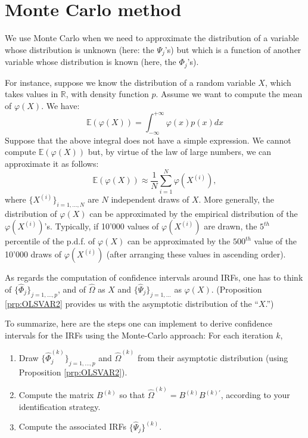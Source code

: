 \documentclass[
  12pt,
]{book}
\providecommand{\tightlist}{%
  \setlength{\itemsep}{0pt}\setlength{\parskip}{0pt}}
\theoremstyle{definition}
\theoremstyle{definition}
\theoremstyle{definition}
\theoremstyle{definition}
\theoremstyle{remark}
\begin{document}
\hypertarget{MonteCarlo}{%
\section{Monte Carlo method}\label{MonteCarlo}}

We use Monte Carlo when we need to approximate the distribution of a variable whose distribution is unknown (here: the \(\Psi_j\)'s) but which is a function of another variable whose distribution is known (here, the \(\Phi_j\)'s).

For instance, suppose we know the distribution of a random variable \(X\), which takes values in \(\mathbb{R}\), with density function \(p\). Assume we want to compute the mean of \(\varphi(X)\). We have:
\[
\mathbb{E}(\varphi(X))=\int_{-\infty}^{+\infty}\varphi(x)p(x)dx
\]
Suppose that the above integral does not have a simple expression. We cannot compute \(\mathbb{E}(\varphi(X))\) but, by virtue of the law of large numbers, we can approximate it as follows:
\[
\mathbb{E}(\varphi(X))\approx\frac{1}{N}\sum_{i=1}^N\varphi(X^{(i)}),
\]
where \(\{X^{(i)}\}_{i=1,...,N}\) are \(N\) independent draws of \(X\). More generally, the distribution of \(\varphi(X)\) can be approximated by the empirical distribution of the \(\varphi(X^{(i)})\)'s. Typically, if 10'000 values of \(\varphi(X^{(i)})\) are drawn, the \(5^{th}\) percentile of the p.d.f. of \(\varphi(X)\) can be approximated by the \(500^{th}\) value of the 10'000 draws of \(\varphi(X^{(i)})\) (after arranging these values in ascending order).

As regards the computation of confidence intervals around IRFs, one has to think of \(\{\widehat{\Phi}_j\}_{j=1,...,p}\), and of \(\widehat{\Omega}\) as \(X\) and \(\{\widehat{\Psi}_j\}_{j=1,...}\) as \(\varphi(X)\). (Proposition \ref{prp:OLSVAR2} provides us with the asymptotic distribution of the ``\(X\).'')

To summarize, here are the steps one can implement to derive confidence intervals for the IRFs using the Monte-Carlo approach: For each iteration \(k\),

\begin{enumerate}
\def\labelenumi{\arabic{enumi}.}
\tightlist
\item
  Draw \(\{\widehat{\Phi}_j^{(k)}\}_{j=1,...,p}\) and \(\widehat{\Omega}^{(k)}\) from their asymptotic distribution (using Proposition \ref{prp:OLSVAR2}).
\item
  Compute the matrix \(B^{(k)}\) so that \(\widehat{\Omega}^{(k)}=B^{(k)}B^{(k)'}\), according to your identification strategy.
\item
  Compute the associated IRFs \(\{\widehat{\Psi}_j\}^{(k)}\).
\end{enumerate}
\end{document}
